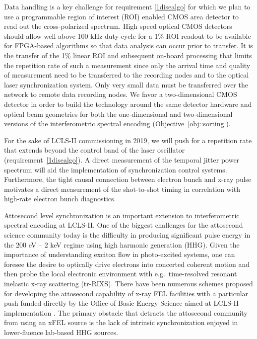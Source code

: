 \documentclass[letterpaper,oneside,11pt]{article}
\begin{document}
Data handling is a key challenge for requirement \ref{1disealgo} for which we plan to use a programmable region of interest (ROI) enabled CMOS area detector \cite{cmosROI} to read out the cross-polarized spectrum.
High speed optical CMOS detectors should allow well above 100 kHz duty-cycle for a 1\% ROI readout \cite{cmosspeed} to be available for FPGA-based algorithms so that data analysis can occur prior to transfer.
It is the transfer of the 1\% linear ROI and subsequent on-board processing that limits the repetition rate of such a measurement since only the arrival time and quality of measurement need to be transferred to the recording nodes and to the optical laser synchronization system.
Only very small data must be transferred over the network to remote data recording nodes.
We favor a two-dimensional CMOS detector in order to build the technology around the same detector hardware and optical beam geometries for both the one-dimensional and two-dimensional versions of the interferometric spectral encoding (Objective~\ref{obj::sorting}).

For the sake of LCLS-II commissioning in 2019, we will push for a repetition rate that extends beyond the control band of the laser oscillator (requirement~\ref{1disealgo}).
A direct measurement of the temporal jitter power spectrum will aid the implementation of synchronization control systems.
Furthermore, the tight causal connection between electron bunch and x-ray pulse motivates a direct measurement of the shot-to-shot timing in correlation with high-rate electron bunch diagnostics. 



Attosecond level synchronization is an important extension to interferometric spectral encoding at LCLS-II.
One of the biggest challenges for the attosecond science community today is the difficulty in producing significant pulse energy in the 200 eV -- 2 keV regime using high harmonic generation (HHG)\cite{Chen2014,Schmidt2016}.
Given the importance of understanding exciton flow in photo-excited systems, one can foresee the desire to optically drive electrons into concerted coherent motion \cite{Biggs2012,Mukamel2013} and then probe the local electronic environment with e.g.~time-resolved resonant inelastic x-ray scattering (tr-RIXS).
There have been numerous schemes proposed for developing the attosecond capability of x-ray FEL facilities \cite{Ding2009,Xiang2009} with a particular push funded directly by the Office of Basic Energy Science aimed at LCLS-II implementation \cite{Marinelli2016,xLEAP}.
The primary obstacle that detracts the attosecond community from using an xFEL source is the lack of intrinsic synchronization enjoyed in lower-fluence lab-based HHG sources.
\end{document}
